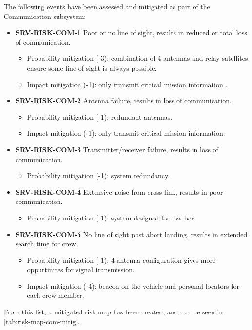\noindent The following events have been assessed and mitigated as part of the Communication subsystem:

\begin{itemize}
	 \item \textbf{SRV-RISK-COM-1} Poor or no line of sight, results in reduced or total loss of communication.
	\begin{itemize}
		 \item Probability mitigation (-3):  combination of 4 antennas and relay satellites ensure some line of sight is always possible.		 \item Impact mitigation (-1):  only transmit critical mission information .	\end{itemize}
	 \item \textbf{SRV-RISK-COM-2} Antenna failure, results in loss of communication.
	\begin{itemize}
		 \item Probability mitigation (-1):  redundant antennas.		 \item Impact mitigation (-1):  only transmit critical mission information.	\end{itemize}
	 \item \textbf{SRV-RISK-COM-3} Transmitter/receiver failure, results in loss of communication.
	\begin{itemize}
		 \item Probability mitigation (-1):  system redundancy.	\end{itemize}
	 \item \textbf{SRV-RISK-COM-4} Extensive noise from cross-link, results in poor communication.
	\begin{itemize}
		 \item Probability mitigation (-1):  system designed for low ber.	\end{itemize}
	 \item \textbf{SRV-RISK-COM-5} No line of sight post abort landing, results in extended search time for crew.
	\begin{itemize}
		 \item Probability mitigation (-1):  4 antenna configuration gives more oppurtinites for signal transmission.		 \item Impact mitigation (-4):  beacon on the vehicle and personal locators for each crew member.	\end{itemize}
\end{itemize}

\noindent From this list, a mitigated risk map has been created, and can be seen in \autoref{tab:risk-map-com-mitig}.

